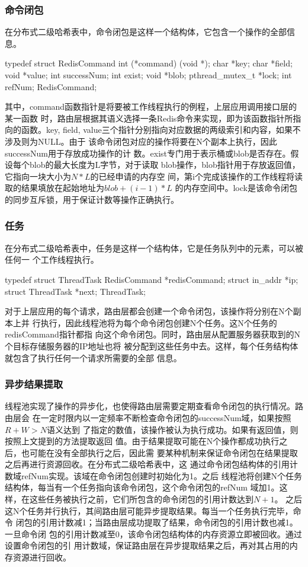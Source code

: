 \subsubsection{命令闭包}
在分布式二级哈希表中，命令闭包是这样一个结构体，它包含一个操作的全部信息。
\begin{code}
typedef struct RedisCommand {
  int (*command) (void *);
  char *key;
  char *field;
  void *value;
  int successNum;
  int exist;
  void *blob;
  pthread_mutex_t *lock;
  int refNum;
} RedisCommand;
\end{code}
其中，command函数指针是将要被工作线程执行的例程，上层应用调用接口层的某一函数
时，路由层根据其语义选择一条Redis命令来实现，即为该函数指针所指向的函数。key,
field, value三个指针分别指向对应数据的两级索引和内容，如果不涉及则为NULL。由于
该命令闭包对应的操作将要在N个副本上执行，因此successNum用于存放成功操作的计
数。exist专门用于表示桶或blob是否存在。假设每个blob的最大长度为L字节，对于读取
blob操作，blob指针用于存放返回值，它指向一块大小为$N * L$的已经申请的内存空
间，第i个完成该操作的工作线程将读取的结果填放在起始地址为$blob + (i - 1) * L$
的内存空间中。lock是该命令闭包的同步互斥锁，用于保证计数等操作正确执行。

\subsubsection{任务}
在分布式二级哈希表中，任务是这样一个结构体，它是任务队列中的元素，可以被任何一
个工作线程执行。
\begin{code}
typedef struct ThreadTask {
  RedisCommand *redisCommand;
  struct in_addr *ip;
  struct ThreadTask *next;
} ThreadTask;
\end{code}
对于上层应用的每个请求，路由层都会创建一个命令闭包，该操作将分别在N个副本上并
行执行，因此线程池将为每个命令闭包创建N个任务。这N个任务的redisCommand指针都指
向这个命令闭包。同时，路由层从配置服务器获取到的N个目标存储服务器的IP地址也将
被分配到这些任务中去。这样，每个任务结构体就包含了执行任何一个请求所需要的全部
信息。

\subsubsection{异步结果提取}
线程池实现了操作的异步化，也使得路由层需要定期查看命令闭包的执行情况。路由层会
在一定时限内以一定频率不断检查命令闭包的successNum域，如果按照$R+W>N$语义达到
了指定的数值，该操作被认为执行成功。如果有返回值，则按照上文提到的方法提取返回
值。由于结果提取可能在N个操作都成功执行之后，也可能在没有全部执行之后，因此需
要某种机制来保证命令闭包在结果提取之后再进行资源回收。在分布式二级哈希表中，这
通过命令闭包结构体的引用计数域refNum实现。该域在命令闭包创建时初始化为1。之后
线程池将创建N个任务结构体，每当有一个任务指向该命令闭包，这个命令闭包的refNum
域加1。这样，在这些任务被执行之前，它们所包含的命令闭包的引用计数达到$N + 1$。
之后这N个任务并行执行，其间路由层可能异步提取结果。每当一个任务执行完毕，命令
闭包的引用计数减1；当路由层成功提取了结果，命令闭包的引用计数也减1。一旦命令闭
包的引用计数减至0，该命令闭包结构体的内存资源立即被回收。通过设置命令闭包的引
用计数域，保证路由层在异步提取结果之后，再对其占用的内存资源进行回收。

